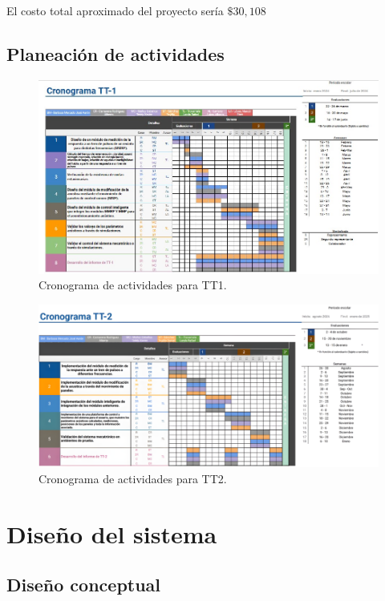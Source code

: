 El costo total aproximado del proyecto sería $\$30,108$

\subsection*{Planeaci\'on de actividades}
\begin{figure}[!htb]
    \centering
    \includegraphics[width=1\textwidth]{imagenes/Protocolo21.jpg}
    \caption{\footnotesize Cronograma de actividades para TT1.}
\end{figure}
\FloatBarrier

\begin{figure}[!htb]
    \centering
    \includegraphics[width=1\textwidth]{imagenes/Protocolo22.png}
    \caption{\footnotesize Cronograma de actividades para TT2.}
\end{figure}
\FloatBarrier

\section{Diseño del sistema}
\subsection{Diseño conceptual}
